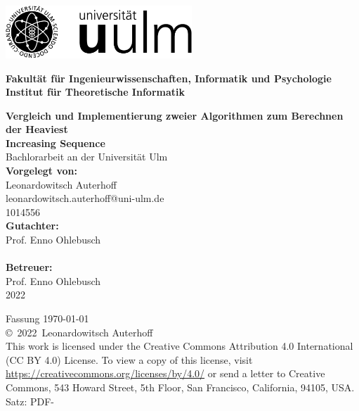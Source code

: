 \documentclass[a4paper,12pt,headsepline,oneside]{scrbook}
\makeatletter
\newcommand{\fullname}{Leonardowitsch Auterhoff}
\newcommand{\email}{leonardowitsch.auterhoff@uni-ulm.de}
\newcommand{\titel}{Vergleich und Implementierung zweier Algorithmen zum Berechnen der Heaviest\\ Increasing Sequence}
\newcommand{\jahr}{2022}
\newcommand{\matnr}{1014556}
\newcommand{\gutachterA}{Prof. Enno Ohlebusch}
\newcommand{\betreuer}{\gutachterA}
\newcommand{\fakultaet}{Fakultät für Ingenieurwissenschaften, Informatik und Psychologie}
\newcommand{\institut}{Institut für Theoretische Informatik}
\newcommand{\arbeit}{Bachlorarbeit}
\makeatother
\begin{document}
\frontmatter

\thispagestyle{empty}
\begin{flushright}	
	\includegraphics[width=7cm]{logo_uulm_sw.png}\vspace{3pt}\\ 
	\parbox[t]{7cm}{\footnotesize\bfseries
		\fakultaet\\
		\mdseries \institut}
\end{flushright}
{
	\vspace{5cm} 
	{\bfseries \LARGE \titel}\\
	\footnotesize
	{\arbeit{} an der Universität Ulm}\\[3em]	
	{\bfseries Vorgelegt von:}\\
	{\fullname\\ \email\\ \matnr}\\[2em]
	{\bfseries Gutachter:}\\                     
	{\gutachterA\\}\\[2em]
	{\bfseries Betreuer:}\\ 
	\betreuer\\
	\vfill \jahr
}


\clearpage
\thispagestyle{empty}
{ \small
  \flushleft
  Fassung \today \\\vfill
  \copyright~\jahr~\fullname\\[0.5em]
This work is licensed under the Creative Commons Attribution 4.0 International (CC BY 4.0) License. To view a copy of this license, visit \href{https://creativecommons.org/licenses/by/4.0/}{https://creativecommons.org/licenses/by/4.0/} or send a letter to Creative Commons, 543 Howard Street, 5th Floor, San Francisco, California, 94105, USA. \\
  Satz: PDF-\LaTeXe
}
\end{document}
